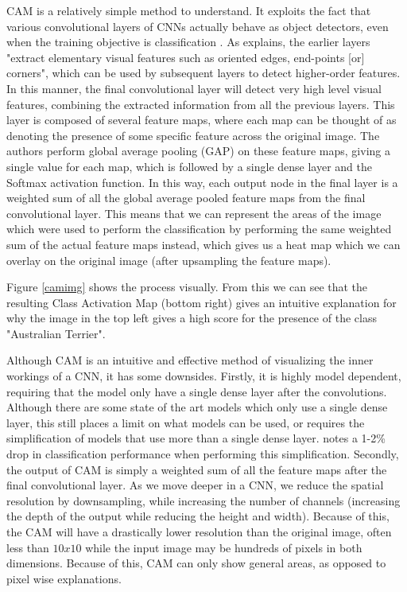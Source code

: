 \documentclass[conference]{IEEEtran}
\begin{document}
CAM is a relatively simple method to understand. It exploits the fact that various convolutional layers of CNNs actually behave as object detectors, even when the training objective is classification \cite{cam}. As \cite{lenet5} explains, the earlier layers "extract elementary visual features such as oriented edges, end-points [or] corners", which can be used by subsequent layers to detect higher-order features. In this manner, the final convolutional layer will detect very high level visual features, combining the extracted information from all the previous layers. This layer is composed of several feature maps, where each map can be thought of as denoting the presence of some specific feature across the original image. The authors perform global average pooling (GAP) on these feature maps, giving a single value for each map, which is followed by a single dense layer and the Softmax activation function. In this way, each output node in the final layer is a weighted sum of all the global average pooled feature maps from the final convolutional layer. This means that we can represent the areas of the image which were used to perform the classification by performing the same weighted sum of the actual feature maps instead, which gives us a heat map which we can overlay on the original image (after upsampling the feature maps).

Figure \ref{camimg} shows the process visually. From this we can see that the resulting Class Activation Map (bottom right) gives an intuitive explanation for why the image in the top left gives a high score for the presence of the class "Australian Terrier".

Although CAM is an intuitive and effective method of visualizing the inner workings of a CNN, it has some downsides. Firstly, it is highly model dependent, requiring that the model only have a single dense layer after the convolutions. Although there are some state of the art models which only use a single dense layer, this still places a limit on what models can be used, or requires the simplification of models that use more than a single dense layer. \cite[4]{cam} notes a 1-2\% drop in classification performance when performing this simplification. Secondly, the output of CAM is simply a weighted sum of all the feature maps after the final convolutional layer. As we move deeper in a CNN, we reduce the spatial resolution by downsampling, while increasing the number of channels (increasing the depth of the output while reducing the height and width). Because of this, the CAM will have a drastically lower resolution than the original image, often less than $10 x 10$ while the input image may be hundreds of pixels in both dimensions. Because of this, CAM can only show general areas, as opposed to pixel wise explanations.
\end{document}
